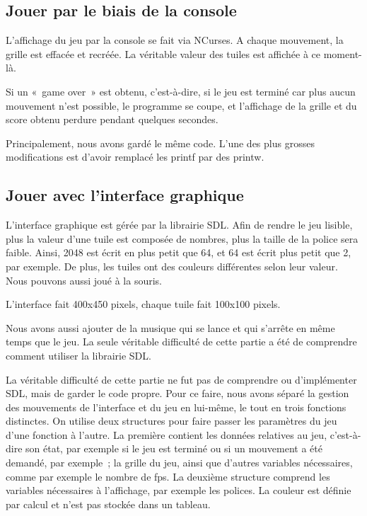 \documentclass[12pt]{report}
\begin{document}
\subsection{Jouer par le biais de la console} 
L’affichage du jeu par la console se fait via NCurses. A chaque mouvement, la grille est effacée et recréée. La véritable valeur des tuiles est affichée à ce moment-là.

Si un « game over » est obtenu, c’est-à-dire, si le jeu est terminé car plus aucun mouvement n’est possible, le programme se coupe, et l’affichage de la grille et du score obtenu perdure pendant quelques secondes.

Principalement, nous avons gardé le même code. L’une des plus grosses modifications est d’avoir remplacé les printf par des printw.

\subsection{Jouer avec l’interface graphique}
L’interface graphique est gérée par la librairie SDL. Afin de rendre le jeu lisible, plus la valeur d’une tuile est composée de nombres, plus la taille de la police sera faible. Ainsi, 2048 est écrit en plus petit que 64, et 64 est écrit plus petit que 2, par exemple. De plus, les tuiles ont des couleurs différentes selon leur valeur. Nous pouvons aussi joué à la souris.

L’interface fait 400x450 pixels, chaque tuile fait 100x100 pixels.

Nous avons aussi ajouter de la musique qui se lance et qui s’arrête en même temps que le jeu.
La seule véritable difficulté de cette partie a été de comprendre comment utiliser la librairie SDL. \cite{ref3} \cite{ref4}

La véritable difficulté de cette partie ne fut pas de comprendre ou d’implémenter SDL, mais de garder le code propre. Pour ce faire, nous avons séparé la gestion des mouvements de l’interface et du  jeu en lui-même, le tout en trois fonctions distinctes.
On utilise deux structures pour faire passer les paramètres du jeu d’une fonction à l’autre. La première contient les données relatives au jeu, c’est-à-dire son état, par exemple si le jeu est terminé ou si un mouvement a été demandé, par exemple ; la grille du jeu, ainsi que d’autres variables nécessaires, comme par exemple le nombre de fps.
La deuxième structure comprend les variables nécessaires à l’affichage, par exemple les polices.
La couleur est définie par calcul et n’est pas stockée dans un tableau.
\end{document}
